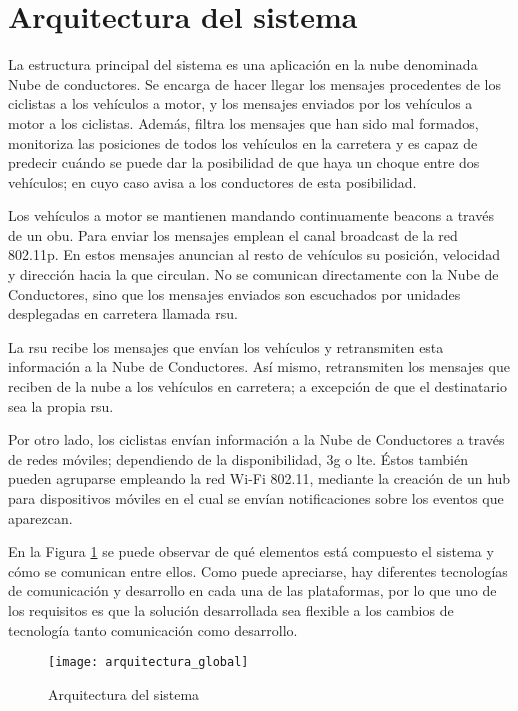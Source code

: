 \section{Arquitectura del sistema}\label{section:arquitecturaSistema}
La estructura principal del sistema es una aplicación en la nube denominada
Nube de conductores. Se encarga de hacer llegar los mensajes procedentes de
los ciclistas a los vehículos a motor, y los mensajes enviados por los
vehículos a motor a los ciclistas. Además, filtra los mensajes que han sido
mal formados, monitoriza las posiciones de todos los vehículos en la carretera
y es capaz de predecir cuándo se puede dar la posibilidad de que haya un choque
entre dos vehículos; en cuyo caso avisa a los conductores de esta posibilidad.

Los vehículos a motor se mantienen mandando continuamente beacons a través
de un \gls{obu}. Para enviar los mensajes emplean el canal broadcast de la
red \Gls{802.11p}. En estos mensajes anuncian al resto de vehículos su
posición, velocidad y dirección hacia la que circulan. No se comunican
directamente con la Nube de Conductores, sino que los mensajes enviados
son escuchados por unidades desplegadas en carretera llamada \gls{rsu}.

La \gls{rsu} recibe los mensajes que envían los vehículos y retransmiten esta
información a la Nube de Conductores. Así mismo, retransmiten los mensajes que
reciben de la nube a los vehículos en carretera; a excepción de que el
destinatario sea la propia \gls{rsu}.

Por otro lado, los ciclistas envían información a la Nube de Conductores a
través de redes móviles; dependiendo de la disponibilidad, \gls{3g} o \gls{lte}.
Éstos también pueden agruparse empleando la red Wi-Fi 802.11, mediante la
creación de un hub para dispositivos móviles en el cual se envían
notificaciones sobre los eventos que aparezcan.

En la Figura \ref{fig:ArquitecturaSistema} se puede observar de qué elementos
está compuesto el sistema y cómo se comunican entre ellos. Como puede
apreciarse, hay diferentes tecnologías de comunicación y desarrollo en cada
una de las plataformas, por lo que uno de los requisitos es que la solución
desarrollada sea flexible a los cambios de tecnología tanto comunicación como
desarrollo.

\begin{figure}[H]
	\begin{center}
		\texttt{[image: arquitectura\_global]}
		\caption{Arquitectura del sistema}
		\label{fig:ArquitecturaSistema}
	 \end{center}
\end{figure}

\FloatBarrier

\FloatBarrier

\FloatBarrier

